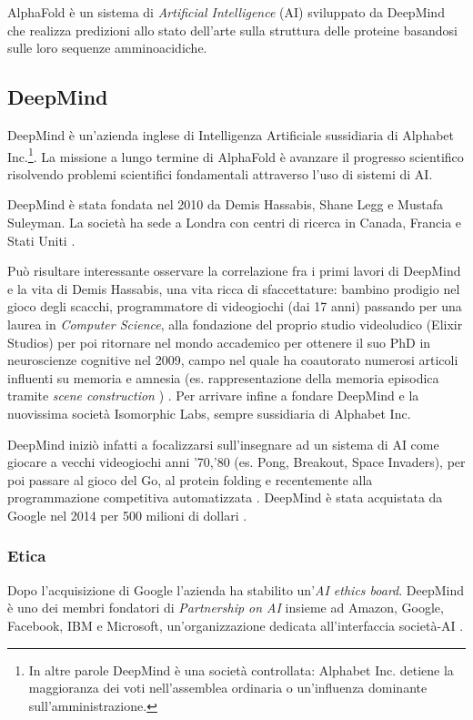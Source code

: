 {

AlphaFold è un sistema di \textit{Artificial Intelligence }(AI) sviluppato da DeepMind che realizza predizioni allo stato dell'arte sulla struttura delle proteine basandosi sulle loro sequenze amminoacidiche.

\subsection{DeepMind}
{
DeepMind è un'azienda inglese di Intelligenza Artificiale sussidiaria di Alphabet Inc.\footnote{In altre parole DeepMind è una società controllata: Alphabet Inc. detiene la maggioranza dei voti nell'assemblea ordinaria o un'influenza dominante sull'amministrazione.}. La missione a lungo termine di AlphaFold è avanzare il progresso scientifico risolvendo problemi scientifici fondamentali attraverso l'uso di sistemi di AI.

\par DeepMind è stata fondata nel 2010 da Demis Hassabis, Shane Legg e Mustafa Suleyman. La società ha sede a Londra con centri di ricerca in Canada, Francia e Stati Uniti \supercite{deepMindWiki}.

Può risultare interessante osservare la correlazione fra i primi lavori di DeepMind e la vita di Demis Hassabis, una vita ricca di sfaccettature: bambino prodigio nel gioco degli scacchi, programmatore di videogiochi (dai 17 anni) passando per una laurea in \textit{Computer Science}, alla fondazione del proprio studio videoludico (Elixir Studios) per poi ritornare nel mondo accademico per ottenere il suo PhD in neuroscienze cognitive nel 2009, campo nel quale ha coautorato numerosi articoli influenti su memoria e amnesia (es. rappresentazione della memoria episodica tramite \textit{scene construction} \supercite{Hassabis2007Jul}) \supercite{hassabisWiki}. Per arrivare infine a fondare DeepMind e la nuovissima società Isomorphic Labs, sempre sussidiaria di Alphabet Inc.

\par DeepMind iniziò infatti a focalizzarsi sull'insegnare ad un sistema di AI come giocare a vecchi videogiochi anni '70,'80 (es. Pong, Breakout, Space Invaders), per poi passare al gioco del Go, al protein folding e recentemente alla programmazione competitiva automatizzata \supercite{competitiveProgrDeepMind}.
DeepMind è stata acquistata da Google nel 2014 per 500 milioni di dollari \supercite{Guardian2014}.

\subsubsection{Etica}
Dopo l'acquisizione di Google l'azienda ha stabilito un'\textit{AI ethics board}. DeepMind è uno dei membri fondatori di \textit{Partnership on AI} insieme ad Amazon, Google, Facebook, IBM e Microsoft, un'organizzazione dedicata all'interfaccia società-AI \supercite{partnershiponai}.



}}
